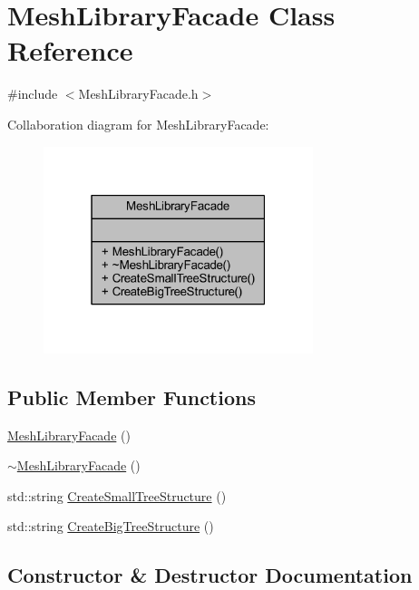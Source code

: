 \hypertarget{class_mesh_library_facade}{}\section{Mesh\+Library\+Facade Class Reference}
\label{class_mesh_library_facade}


{\ttfamily \#include $<$Mesh\+Library\+Facade.\+h$>$}



Collaboration diagram for Mesh\+Library\+Facade\+:
\nopagebreak
\begin{figure}[H]
\begin{center}
\leavevmode
\includegraphics[width=223pt]{class_mesh_library_facade__coll__graph}
\end{center}
\end{figure}
\subsection*{Public Member Functions}
\begin{DoxyCompactItemize}
\item 
\mbox{\hyperlink{class_mesh_library_facade_aa1847261029ac07a348fc4395814405b}{Mesh\+Library\+Facade}} ()
\item 
\mbox{\hyperlink{class_mesh_library_facade_a78a45bb4fecd4d49f578d512757012a5}{$\sim$\+Mesh\+Library\+Facade}} ()
\item 
std\+::string \mbox{\hyperlink{class_mesh_library_facade_ac17887d31ee505066651081d0613660e}{Create\+Small\+Tree\+Structure}} ()
\item 
std\+::string \mbox{\hyperlink{class_mesh_library_facade_a72fec109c899a1491a1f142402123787}{Create\+Big\+Tree\+Structure}} ()
\end{DoxyCompactItemize}


\subsection{Constructor \& Destructor Documentation}
\mbox{\label{class_mesh_library_facade_aa1847261029ac07a348fc4395814405b}} 
